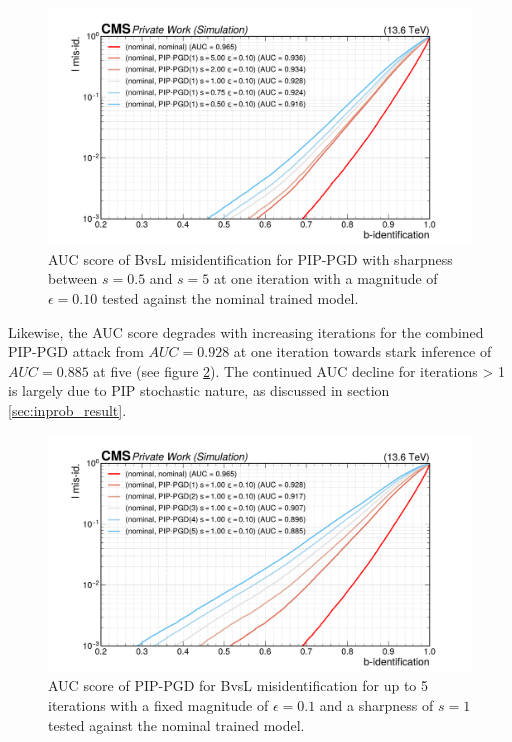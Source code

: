 \begin{figure}[h]
\centering
    \includegraphics[width=15cm]{media/output/roc_bvsl_combined_sharpness.pdf}
    \caption{AUC score of BvsL misidentification for PIP-PGD with sharpness between $s=0.5$ and $s=5$ at one iteration with a magnitude of $\epsilon=0.10$ tested against the nominal trained model.}
    \label{fig:combined_testing_sharpness}
\end{figure}

Likewise, the AUC score degrades with increasing iterations for the combined PIP-PGD attack from $AUC=0.928$ at one iteration towards stark inference of $AUC=0.885$ at five (see figure \ref{fig:combined_testing_iterations}). The continued AUC decline for iterations > 1 is largely due to PIP stochastic nature, as discussed in section \ref{sec:inprob_result}.

\begin{figure}[h]
\centering
    \includegraphics[width=15cm]{media/output/roc_bvsl_combined_iterations.pdf}
    \caption{AUC score of PIP-PGD for BvsL misidentification for up to 5 iterations with a fixed magnitude of $\epsilon=0.1$ and a sharpness of $s=1$ tested against the nominal trained model.}
    \label{fig:combined_testing_iterations}
\end{figure}


